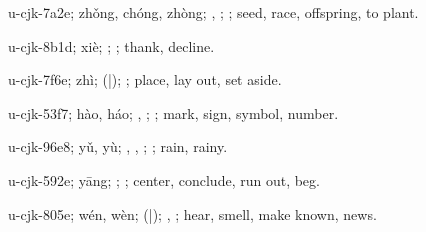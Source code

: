 \begin{multicols}{2}
{\cjkgGlue{}u-cjk-7a2e; zhǒng, chóng, zhòng; \cjkgGlue{}, \cjkgGlue{}; \cjkgGlue{}; seed, race, offspring, to plant.

\cjkgGlue{}u-cjk-8b1d; xiè; \cjkgGlue{}\cjkgGlue{}\cjkgGlue{}; \cjkgGlue{}; thank, decline.

\cjkgGlue{}u-cjk-7f6e; zhì; \cjkgGlue{}\cjkgGlue{}(\cjkgGlue{}|\cjkgGlue{}); \cjkgGlue{}; place, lay out, set aside.

\cjkgGlue{}u-cjk-53f7; hào, háo; \cjkgGlue{}\cjkgGlue{}\cjkgGlue{}, \cjkgGlue{}; \cjkgGlue{}; mark, sign, symbol, number.

\cjkgGlue{}u-cjk-96e8; yǔ, yù; \cjkgGlue{}, \cjkgGlue{}, \cjkgGlue{}; \cjkgGlue{}; rain, rainy.

\cjkgGlue{}u-cjk-592e; yāng; \cjkgGlue{}; \cjkgGlue{}; center, conclude, run out, beg.

\cjkgGlue{}u-cjk-805e; wén, wèn; \cjkgGlue{}\cjkgGlue{}(\cjkgGlue{}|\cjkgGlue{}); \cjkgGlue{}, \cjkgGlue{}; hear, smell, make known, news.

}
\end{multicols}
